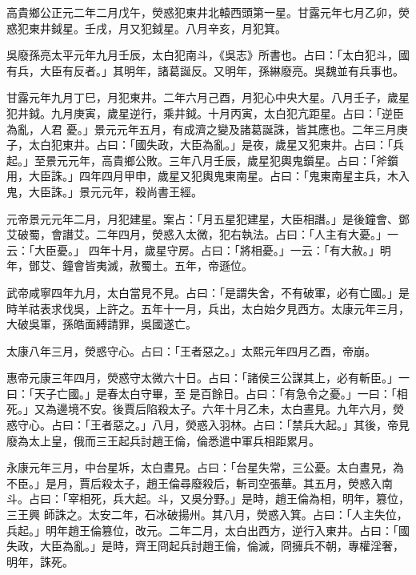 \begin{pinyinscope}
 高貴鄉公正元二年二月戊午，熒惑犯東井北轅西頭第一星。甘露元年七月乙卯，熒惑犯東井鉞星。壬戌，月又犯鉞星。八月辛亥，月犯箕。



 吳廢孫亮太平元年九月壬辰，太白犯南斗，《吳志》所書也。占曰：「太白犯斗，國有兵，大臣有反者。」其明年，諸葛誕反。又明年，孫綝廢亮。吳魏並有兵事也。



 甘露元年九月丁巳，月犯東井。二年六月己酉，月犯心中央大星。八月壬子，歲星犯井鉞。九月庚寅，歲星逆行，乘井鉞。十月丙寅，太白犯亢距星。占曰：「逆臣為亂，人君
 憂。」景元元年五月，有成濟之變及諸葛誕誅，皆其應也。二年三月庚子，太白犯東井。占曰：「國失政，大臣為亂。」是夜，歲星又犯東井。占曰：「兵起。」至景元元年，高貴鄉公敗。三年八月壬辰，歲星犯輿鬼鑕星。占曰：「斧鑕用，大臣誅。」四年四月甲申，歲星又犯輿鬼東南星。占曰：「鬼東南星主兵，木入鬼，大臣誅。」景元元年，殺尚書王經。



 元帝景元元年二月，月犯建星。案占：「月五星犯建星，大臣相譖。」是後鐘會、鄧艾破蜀，會譖艾。二年四月，熒惑入太微，犯右執法。占曰：「人主有大憂。」一云：「大臣憂。」
 四年十月，歲星守房。占曰：「將相憂。」一云：「有大赦。」明年，鄧艾、鐘會皆夷滅，赦蜀土。五年，帝遜位。



 武帝咸寧四年九月，太白當見不見。占曰：「是謂失舍，不有破軍，必有亡國。」是時羊祜表求伐吳，上許之。五年十一月，兵出，太白始夕見西方。太康元年三月，大破吳軍，孫皓面縛請罪，吳國遂亡。



 太康八年三月，熒惑守心。占曰：「王者惡之。」太熙元年四月乙酉，帝崩。



 惠帝元康三年四月，熒惑守太微六十日。占曰：「諸侯三公謀其上，必有斬臣。」一曰：「天子亡國。」是春太白守畢，至
 是百餘日。占曰：「有急令之憂。」一曰：「相死。」又為邊境不安。後賈后陷殺太子。六年十月乙未，太白晝見。九年六月，熒惑守心。占曰：「王者惡之。」八月，熒惑入羽林。占曰：「禁兵大起。」其後，帝見廢為太上皇，俄而三王起兵討趙王倫，倫悉遣中軍兵相距累月。



 永康元年三月，中台星坼，太白晝見。占曰：「台星失常，三公憂。太白晝見，為不臣。」是月，賈后殺太子，趙王倫尋廢殺后，斬司空張華。其五月，熒惑入南斗。占曰：「宰相死，兵大起。斗，又吳分野。」是時，趙王倫為相，明年，篡位，三王興
 師誅之。太安二年，石冰破揚州。其八月，熒惑入箕。占曰：「人主失位，兵起。」明年趙王倫篡位，改元。二年二月，太白出西方，逆行入東井。占曰：「國失政，大臣為亂。」是時，齊王冏起兵討趙王倫，倫滅，冏擁兵不朝，專權淫奢，明年，誅死。




\end{pinyinscope}

